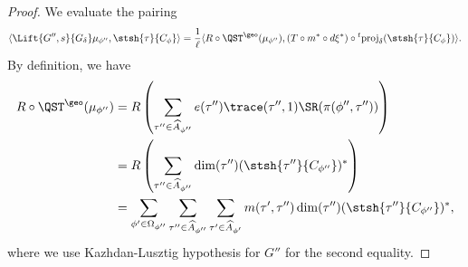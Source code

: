 \documentclass[11pt,letterpaper]{amsart}
\numberwithin{equation}{section}
\begin{document}
\begin{proof}
    We evaluate the pairing
    \begin{align}\label{eq trans=lift disconnected 1}
        \langle \Lift{G'',s}{G_{\delta}} \mu_{\phi''}, \stsh{\tau}{C_{\phi}}\rangle= \frac{1}{\ell}\langle R \circ   \QST^\geo (\mu_{\phi''}),   (T \circ m^{\ast} \circ d\xi^{\ast})  \circ {}^t\textrm{proj}_{\delta} (\stsh{\tau}{C_{\phi}})\rangle.
    \end{align}
    By definition, we have
    \begin{align*}
        R \circ   \QST^\geo (\mu_{\phi''})&= R \left( \sum_{\tau'' \in \widehat{A}_{\phi''}} e(\tau'') \trace(\tau'',1) \SR(\pi(\phi'', \tau''))  \right)\\
        &= R \left( \sum_{\tau'' \in \widehat{A}_{\phi''}} \dim(\tau'') (\stsh{\tau''}{C_{\phi''}})^{\ast}  \right)\\
        &= \sum_{\phi'\in \Omega_{\phi''}}  \sum_{\tau'' \in \widehat{A}_{\phi''}} \sum_{\tau' \in \widehat{A}_{\phi'}} m(\tau',\tau'')  \dim(\tau'') (\stsh{\tau''}{C_{\phi''}})^{\ast},
    \end{align*}
    where we use Kazhdan-Lusztig hypothesis for $G''$ for the second equality.


\end{proof}
\end{document}
